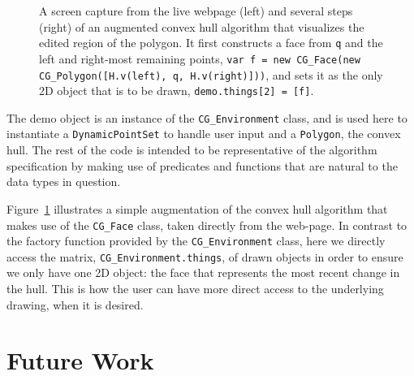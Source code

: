 \documentclass[a4paper,UKenglish]{lipics-v2016}
\begin{document}
\begin{figure}[htbp]
  \caption{A screen capture from the live webpage (left) and several steps (right) of an augmented convex hull algorithm that visualizes the edited region of the polygon.
  It first constructs a face from \texttt{q} and the left and right-most remaining points, \texttt{var f = new CG\_Face(new CG\_Polygon([H.v(left), q, H.v(right)]))}, and sets it as the only 2D object that is to be drawn, \texttt{demo.things[2] = [f]}.}
  \label{fig:demo}
\end{figure}

  The demo object is an instance of the \texttt{CG\_Environment} class, and is used here to instantiate a \texttt{DynamicPointSet} to handle user input and a \texttt{Polygon}, the convex hull.
  The rest of the code is intended to be representative of the algorithm specification by making use of predicates and functions that are natural to the data types in question.

  Figure~\ref{fig:demo} illustrates a simple augmentation of the convex hull algorithm that makes use of the \texttt{CG\_Face} class, taken directly from the web-page.
  In contrast to the factory function provided by the \texttt{CG\_Environment} class, here we directly access the matrix, \texttt{CG\_Environment.things}, of drawn objects in order to ensure we only have one 2D object: the face that represents the most recent change in the hull.
  This is how the user can have more direct access to the underlying drawing, when it is desired.



%
%


\section{Future Work} %
\label{sec:future_work}
\end{document}
